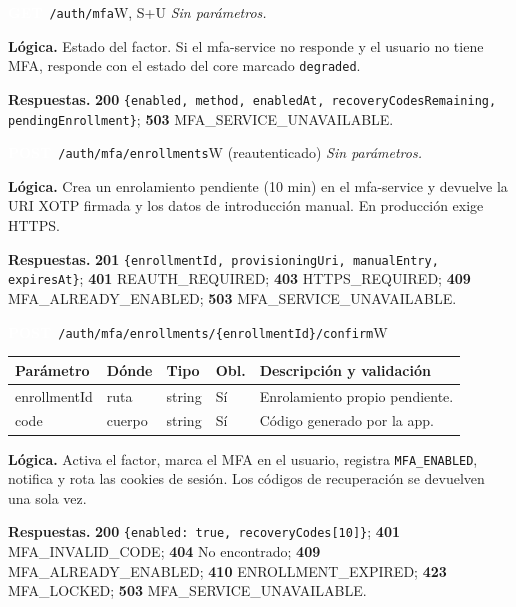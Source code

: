 \documentclass[11pt,a4paper]{report}
\newcommand{\verbo}[2]{\colorbox{#1}{\textcolor{white}{\ttfamily\bfseries\small #2}}}
\begin{document}
\begin{apiendpoint}{\verbo{verbget}{GET}\ \texttt{/\allowbreak{}auth/\allowbreak{}mfa}}{W, S+U}
\textit{Sin parámetros.}
\par\smallskip\textbf{Lógica.} Estado del factor. Si el mfa-service no responde y el usuario no tiene MFA, responde con el estado del core marcado \texttt{degraded}.
\par\smallskip\textbf{Respuestas.} \textbf{200} \texttt{\{enabled,\allowbreak{} method,\allowbreak{} enabledAt,\allowbreak{} recoveryCodesRemaining,\allowbreak{} pendingEnrollment\}}; \textbf{503} MFA\_SERVICE\_UNAVAILABLE.
\end{apiendpoint}
\begin{apiendpoint}{\verbo{verbpost}{POST}\ \texttt{/\allowbreak{}auth/\allowbreak{}mfa/\allowbreak{}enrollments}}{W (reautenticado)}
\textit{Sin parámetros.}
\par\smallskip\textbf{Lógica.} Crea un enrolamiento pendiente (10 min) en el mfa-service y devuelve la URI XOTP firmada y los datos de introducción manual. En producción exige HTTPS.
\par\smallskip\textbf{Respuestas.} \textbf{201} \texttt{\{enrollmentId,\allowbreak{} provisioningUri,\allowbreak{} manualEntry,\allowbreak{} expiresAt\}}; \textbf{401} REAUTH\_REQUIRED; \textbf{403} HTTPS\_REQUIRED; \textbf{409} MFA\_ALREADY\_ENABLED; \textbf{503} MFA\_SERVICE\_UNAVAILABLE.
\end{apiendpoint}
\begin{apiendpoint}{\verbo{verbpost}{POST}\ \texttt{/\allowbreak{}auth/\allowbreak{}mfa/\allowbreak{}enrollments/\allowbreak{}\{enrollmentId\}/\allowbreak{}confirm}}{W}
\begin{tabularx}{\linewidth}{@{}>{\ttfamily\raggedright}p{3.0cm}p{1.35cm}p{1.9cm}p{0.9cm}X@{}}
\toprule \normalfont\bfseries Parámetro & \bfseries Dónde & \bfseries Tipo & \bfseries Obl. & \bfseries Descripción y validación\\ \midrule
enrollmentId & ruta & string & Sí & Enrolamiento propio pendiente.\\
code & cuerpo & string & Sí & Código generado por la app.\\
\bottomrule\end{tabularx}
\par\smallskip\textbf{Lógica.} Activa el factor, marca el MFA en el usuario, registra \texttt{MFA\_ENABLED}, notifica y rota las cookies de sesión. Los códigos de recuperación se devuelven una sola vez.
\par\smallskip\textbf{Respuestas.} \textbf{200} \texttt{\{enabled: true,\allowbreak{} recoveryCodes[10]\}}; \textbf{401} MFA\_INVALID\_CODE; \textbf{404} No encontrado; \textbf{409} MFA\_ALREADY\_ENABLED; \textbf{410} ENROLLMENT\_EXPIRED; \textbf{423} MFA\_LOCKED; \textbf{503} MFA\_SERVICE\_UNAVAILABLE.
\end{apiendpoint}
\end{document}
